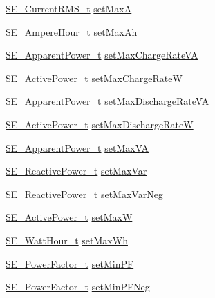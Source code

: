 \begin{DoxyCompactItemize}
\hyperlink{structSE__CurrentRMS__t}{S\+E\+\_\+\+Current\+R\+M\+S\+\_\+t} \hyperlink{group__DERSettings_ga2f8c9d376ed4b63d27652e879fa655b6}{set\+MaxA}
\item 
\hyperlink{structSE__AmpereHour__t}{S\+E\+\_\+\+Ampere\+Hour\+\_\+t} \hyperlink{group__DERSettings_ga8c5b2f3caab9dde5fbd59078af32e306}{set\+Max\+Ah}
\item 
\hyperlink{structSE__ApparentPower__t}{S\+E\+\_\+\+Apparent\+Power\+\_\+t} \hyperlink{group__DERSettings_gac22ce2b6b9ee46a8127b79e33a71afbb}{set\+Max\+Charge\+Rate\+VA}
\item 
\hyperlink{structSE__ActivePower__t}{S\+E\+\_\+\+Active\+Power\+\_\+t} \hyperlink{group__DERSettings_ga1979ec0e73dd8d0c2c689be68e90580c}{set\+Max\+Charge\+RateW}
\item 
\hyperlink{structSE__ApparentPower__t}{S\+E\+\_\+\+Apparent\+Power\+\_\+t} \hyperlink{group__DERSettings_ga6b44491a30152c3df1db3ae063bd1fe2}{set\+Max\+Discharge\+Rate\+VA}
\item 
\hyperlink{structSE__ActivePower__t}{S\+E\+\_\+\+Active\+Power\+\_\+t} \hyperlink{group__DERSettings_ga3d68c7285c446c74efb76158a8d0ec2d}{set\+Max\+Discharge\+RateW}
\item 
\hyperlink{structSE__ApparentPower__t}{S\+E\+\_\+\+Apparent\+Power\+\_\+t} \hyperlink{group__DERSettings_ga401a2c7fda7fbea901c15746d63877d9}{set\+Max\+VA}
\item 
\hyperlink{structSE__ReactivePower__t}{S\+E\+\_\+\+Reactive\+Power\+\_\+t} \hyperlink{group__DERSettings_ga40736afafc4625a920cd726bb86c889f}{set\+Max\+Var}
\item 
\hyperlink{structSE__ReactivePower__t}{S\+E\+\_\+\+Reactive\+Power\+\_\+t} \hyperlink{group__DERSettings_gab5d6fb6cb61c4d10e02d3717c40603a7}{set\+Max\+Var\+Neg}
\item 
\hyperlink{structSE__ActivePower__t}{S\+E\+\_\+\+Active\+Power\+\_\+t} \hyperlink{group__DERSettings_ga5c5d4f29bd3733e07577d46d4314705f}{set\+MaxW}
\item 
\hyperlink{structSE__WattHour__t}{S\+E\+\_\+\+Watt\+Hour\+\_\+t} \hyperlink{group__DERSettings_ga73e4e2883d95a828b83ad77c478f38ae}{set\+Max\+Wh}
\item 
\hyperlink{structSE__PowerFactor__t}{S\+E\+\_\+\+Power\+Factor\+\_\+t} \hyperlink{group__DERSettings_ga25d7e40750e98570edb457a8b1cac5e7}{set\+Min\+PF}
\item 
\hyperlink{structSE__PowerFactor__t}{S\+E\+\_\+\+Power\+Factor\+\_\+t} \hyperlink{group__DERSettings_ga7fde7d061c8613af2bd0e09cd23921b5}{set\+Min\+P\+F\+Neg}

\end{DoxyCompactItemize}
